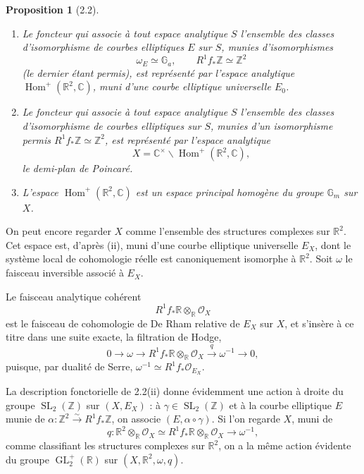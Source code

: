 \documentclass[10pt]{article}
\newcommand{\C}{\mathbb C}
\newcommand{\R}{\mathbb R}
\newcommand{\Z}{\mathbb Z}
\newcommand{\Ga}{\mathbb G_a}
\newcommand{\Gm}{\mathbb G_m}
\newcommand{\GL}{\operatorname{GL}}
\newcommand{\SL}{\operatorname{SL}}
\newcommand{\Hom}{\operatorname{Hom}}
\newcommand{\cO}{\mathcal O}
\newtheorem*{proposition}{Proposition}
\begin{document}
\begin{proposition}[2.2]
\leavevmode
\begin{enumerate}[label=(\roman*)]
\item Le foncteur qui associe à tout espace analytique $S$ l'ensemble des classes
d'isomorphisme de courbes elliptiques $E$ sur $S$, munies d'isomorphismes
\[
\omega_E\simeq \Ga,\qquad R^1f_*\Z\simeq \Z^2
\]
(le dernier étant permis), est représenté par l'espace analytique
$\Hom^+(\R^2,\C)$, muni d'une courbe elliptique universelle $E_0$.

\item Le foncteur qui associe à tout espace analytique $S$ l'ensemble des classes
d'isomorphisme de courbes elliptiques sur $S$, munies d'un isomorphisme permis
$R^1f_*\Z\simeq \Z^2$, est représenté par l'espace analytique
\[
X=\C^\times\backslash\Hom^+(\R^2,\C),
\]
le demi-plan de Poincaré.

\item L'espace $\Hom^+(\R^2,\C)$ est un espace principal homogène du groupe $\Gm$ sur
$X$.
\end{enumerate}
\end{proposition}

On peut encore regarder $X$ comme l'ensemble des structures complexes sur $\R^2$.
Cet espace est, d'après (ii), muni d'une courbe elliptique universelle $E_X$, dont le système
local de cohomologie réelle est canoniquement isomorphe à $\R^2$. Soit $\omega$ le
faisceau inversible associé à $E_X$.

Le faisceau analytique cohérent
\[
R^1f_*\R\otimes_\R\cO_X
\]
est le faisceau de cohomologie de De Rham relative de $E_X$ sur $X$, et s'insère à ce titre
dans une suite exacte, la filtration de Hodge,
\[
0\longrightarrow \omega\longrightarrow R^1f_*\R\otimes_\R\cO_X
\xrightarrow{q}\omega^{-1}\longrightarrow 0,
\]
puisque, par dualité de Serre, $\omega^{-1}\simeq R^1f_*\cO_{E_X}$.

La description fonctorielle de 2.2(ii) donne évidemment une action à droite du groupe
$\SL_2(\Z)$ sur $(X,E_X)$ : à $\gamma\in\SL_2(\Z)$ et à la courbe elliptique $E$ munie de
$\alpha:\Z^2\xrightarrow{\sim}R^1f_*\Z$, on associe $(E,\alpha\circ\gamma)$. Si l'on
regarde $X$, muni de
\[
q:\R^2\otimes_\R\cO_X\simeq R^1f_*\R\otimes_\R\cO_X\longrightarrow \omega^{-1},
\]
comme classifiant les structures complexes sur $\R^2$, on a la même action évidente du
groupe $\GL_2^+(\R)$ sur $(X,\R^2,\omega,q)$.
\end{document}
